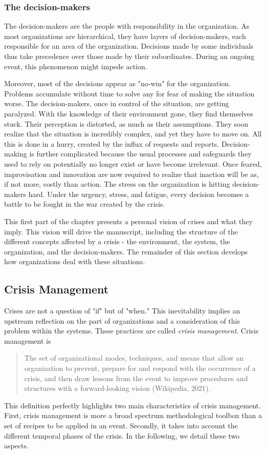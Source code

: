\subsubsection{The decision-makers}
The decision-makers are the people with responsibility in the organization.
As most organizations are hierarchical, they have layers of decision-makers, each responsible for an area of the organization.
Decisions made by some individuals thus take precedence over those made by their subordinates.
During an ongoing event, this phenomenon might impede action.

Moreover, most of the decisions appear as "no-win" for the organization.
Problems accumulate without time to solve any for fear of making the situation worse.
The decision-makers, once in control of the situation, are getting paralyzed.
With the knowledge of their environment gone, they find themselves stuck.
Their perception is distorted, as much as their assumptions.
They soon realize that the situation is incredibly complex, and yet they have to move on.
All this is done in a hurry, created by the influx of requests and reports.
Decision-making is further complicated because the usual processes and safeguards they used to rely on potentially no longer exist or have become irrelevant.
Once feared, improvisation and innovation are now required to realize that inaction will be as, if not more, costly than action.
The stress on the organization is hitting decision-makers hard.
Under the urgency, stress, and fatigue, every decision becomes a battle to be fought in the war created by the crisis.

This first part of the chapter presents a personal vision of crises and what they imply.
This vision will drive the manuscript, including the structure of the different concepts affected by a crisis - the environment, the system, the organization, and the decision-makers.
The remainder of this section develops how organizations deal with these situations.

\subsection{Crisis Management}
Crises are not a question of "if" but of "when."
This inevitability implies an upstream reflection on the part of organizations and a consideration of this problem within the systems.
These practices are called \emph{crisis management}.
Crisis management is
\blockquote{The set of organizational modes, techniques, and means that allow an organization to prevent,
    prepare for and respond with the occurrence of a crisis, and then draw lessons from the event to improve procedures and structures
    with a forward-looking vision (Wikipedia, 2021).}
This definition perfectly highlights two main characteristics of crisis management.
First, crisis management is more a broad spectrum methodological toolbox than a set of recipes to be applied in an event.
Secondly, it takes into account the different temporal phases of the crisis.
In the following, we detail these two aspects.

